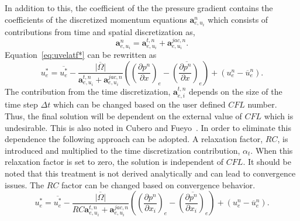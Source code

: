 In addition to this, the coefficient of the the pressure gradient contains the coefficients of the discretized momentum equations $\mathbf{a}_{e,u_i}^n$ which consists of contributions from time and spatial discretization as,
\begin{equation*}
\mathbf{a}_{e,u_i}^n = \boldsymbol{a}_{e,u_i}^{t,n} + \boldsymbol{a}_{e,u_i}^{jac,n}.
\end{equation*}
Equation~\ref{eq:uvelatf*} can be rewritten as
\begin{equation*}
u_{e}^{\ast}=\overline{u_{e}^{\ast}}-\overline{\frac{|\Omega|}{\boldsymbol{a}_{e,u_i}^{t,n} + \boldsymbol{a}_{e,u_i}^{jac,n}}}\left(\left(\frac{\partial p^{n}}{\partial x}\right)_{e}-\overline{\left(\frac{\partial p^{n}}{\partial x}\right)_{e}}\right)+ \left(u_{e}^n - \overline{u}_{e}^n\right).
\end{equation*}
The contribution from the time discretization, $\boldsymbol{a}_{e,i}^{t,n}$ depends on the size of the time step $\Delta t$ which can be changed based on the user defined $CFL$ number. Thus, the final solution will be dependent on the external value of $CFL$ which is undesirable. This is also noted in Cubero and Fueyo~\cite{Cubero2007}. In order to eliminate this dependence the following approach can be adopted. A relaxation factor, $RC$, is introduced and multiplied to the time discretization contribution, $\alpha_t$. When this relaxation factor is set to zero, the solution is independent of $CFL$. It should be noted that this treatment is not derived analytically and can lead to convergence issues. The $RC$ factor can be changed based on convergence behavior.
\begin{equation*}
u_{e}^{\ast}=\overline{u_{e}^{\ast}}-\overline{\frac{|\Omega|}{RC\boldsymbol{a}_{e,u_i}^{t,n} + \boldsymbol{a}_{e,u_i}^{jac,n}}}\left(\left(\frac{\partial p^{n}}{\partial x_i}\right)_{e}-\overline{\left(\frac{\partial p^{n}}{\partial x_i}\right)_{e}}\right)+ \left(u_{e}^n - \overline{u}_{e}^n\right).
\end{equation*}


